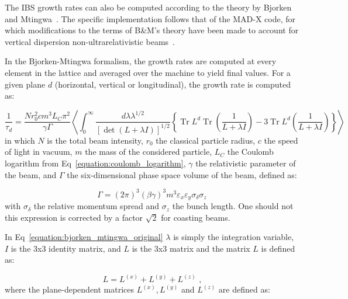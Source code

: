 The IBS growth rates can also be computed according to the theory by Bjorken and Mtingwa~\cite{CERN:Bjorken_Mtingwa:Intrabeam_Scattering}.
The specific implementation follows that of the MAD-X code, for which modifications to the terms of B\&M's theory have been made to account for vertical dispersion non-ultrarelativistic beams~\cite{CERN:Antoniou:Revision_IBS_MADX}.
\newline

In the Bjorken-Mtingwa formalism, the growth rates are computed at every element in the lattice and averaged over the machine to yield final values.
For a given plane \(d\) (horizontal, vertical or longitudinal), the growth rate is computed as:

\begin{equation}
    \frac{1}{\tau_d} = \frac{N r_0^{2} c m^3 L_C \pi^{2}}{\gamma \Gamma} \left\langle \int_0^{\infty} \frac{d \lambda \lambda^{1 / 2}}{\left[\operatorname{det}(L + \lambda I)\right]^{1/2}} \left\{\operatorname{Tr} L^d \operatorname{Tr}\left(\frac{1}{L + \lambda I}\right) - 3 \operatorname{Tr} L^d \left(\frac{1}{L + \lambda I}\right)\right\}\right\rangle
    \label{equation:bjorken_mtingwa_original}
\end{equation}
in which \(N\) is the total beam intensity, \(r_0\) the classical particle radius, \(c\) the speed of light in vacuum, \(m\) the mass of the considered particle, \(L_C\) the Coulomb logarithm from Eq~\eqref{equation:coulomb_logarithm}, \(\gamma\) the relativistic parameter of the beam, and \(\Gamma\) the six-dimensional phase space volume of the beam, defined as:

\begin{equation}
    \Gamma = \left( 2 \pi \right)^3 \left( \beta \gamma \right)^3 m^3 \varepsilon_x \varepsilon_y \sigma_{\delta} \sigma_z
\end{equation}
with \(\sigma_{\delta}\) the relative momentum spread and \(\sigma_z\) the bunch length.
One should not this expression is corrected by a factor \(\sqrt{2}\) for coasting beams.

In Eq~\eqref{equation:bjorken_mtingwa_original} \(\lambda\) is simply the integration variable, \(I\) is the 3x3 identity matrix, and \(L\) is the 3x3 matrix and the matrix \(L\) is defined as:

\begin{equation}
    L = L^{(x)} + L^{(y)} + L^{(z)} \text{ ,}
\end{equation}
where the plane-dependent matrices \(L^{(x)}, L^{(y)}\) and \(L^{(z)}\) are defined as:

